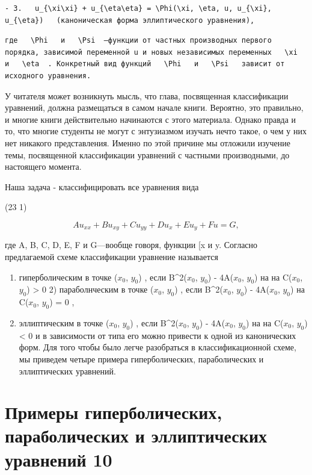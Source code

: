 \documentclass[
  ukrainian,
]{article}
\begin{document}
\begin{verbatim}
- 3.   u_{\xi\xi} + u_{\eta\eta} = \Phi(\xi, \eta, u, u_{\xi}, u_{\eta})   (каноническая форма эллиптического уравнения),
\end{verbatim}

\begin{verbatim}
где   \Phi   и   \Psi  —функции от частных производных первого порядка, зависимой переменной u и новых независимых переменных   \xi   и   \eta  . Конкретный вид функций   \Phi   и   \Psi   зависит от исходного уравнения.
\end{verbatim}

У читателя может возникнуть мысль, что глава, посвященная классификации
уравнений, должна размещаться в самом начале книги. Вероятно, это
правильно, и многие книги действительно начинаются с этого материала.
Однако правда и то, что многие студенты не могут с энтузиазмом изучать
нечто такое, о чем у них нет никакого представления. Именно по этой
причине мы отложили изучение темы, посвященной классификации уравнений с
частными производными, до настоящего момента.

Наша задача - классифицировать все уравнения вида

(23 1)

\[
Au_{xx} + Bu_{xy} + Cu_{yy} + Du_x + Eu_y + Fu = G,
\]

где A, B, C, D, E, F и G---вообще говоря, функции {[}x и y. Согласно
предлагаемой схеме классификации уравнение называется

\begin{enumerate}
\def\labelenumi{\arabic{enumi})}
\item
  гиперболическим в точке (\(x_0\), \(y_0\)) , если B\^{}2(\(x_0\),
  \(y_0\)) - 4A(\(x_0\), \(y_0\))  на  на C(\(x_0\),
  \(y_0\)) \textgreater{} 0 2) параболнческим в точке (\(x_0\), \(y_0\))
  , если B\^{}2(\(x_0\), \(y_0\)) - 4A(\(x_0\), \(y_0\))  на
  C(\(x_0\), \(y_0\)) = 0 ,
\item
  эллиптическим в точке (\(x_0\), \(y_0\)) , если B\^{}2(\(x_0\),
  \(y_0\)) - 4A(\(x_0\), \(y_0\))  на  на C(\(x_0\),
  \(y_0\)) \textless{} 0 и в зависимости от типа его можно привести к
  одной из канонических форм. Для того чтобы было легче разобраться в
  классификационной схеме, мы приведем четыре примера гиперболических,
  параболических и эллиптических уравнений.
\end{enumerate}

\section{Примеры гиперболических, параболических и эллиптических
уравнений
10}\label{ux43fux440ux438ux43cux435ux440ux44b-ux433ux438ux43fux435ux440ux431ux43eux43bux438ux447ux435ux441ux43aux438ux445-ux43fux430ux440ux430ux431ux43eux43bux438ux447ux435ux441ux43aux438ux445-ux438-ux44dux43bux43bux438ux43fux442ux438ux447ux435ux441ux43aux438ux445-ux443ux440ux430ux432ux43dux435ux43dux438ux439-10}
\end{document}
